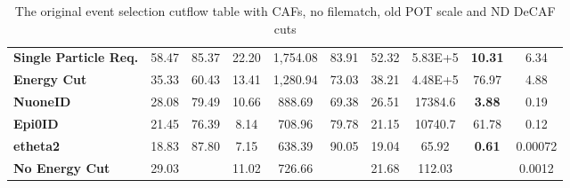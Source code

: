 \begin{table}[!hb]
\begin{tabular}{|l|ccc|ccc|ccc|}
\textbf{Single Particle Req.}                            & 58.47                                  & 85.37     & 22.20     & 1,754.08                                         & 83.91     & 52.32     & 5.83E+5                                         & \textbf{10.31}     & 6.34      \\
\textbf{Energy Cut}                                      & 35.33                                  & 60.43     & 13.41     & 1,280.94                                         & 73.03     & 38.21     & 4.48E+5                                         & 76.97     & 4.88      \\
\textbf{NuoneID}                                         & 28.08                                  & 79.49     & 10.66     & 888.69                                          & 69.38     & 26.51     & 17384.6                                         & \textbf{3.88}      & 0.19      \\
\textbf{Epi0ID}                                          & 21.45                                  & 76.39     & 8.14      & 708.96                                          & 79.78     & 21.15     & 10740.7                                         & 61.78     & 0.12      \\
\rowcolor[HTML]{67FD9A} 
\textbf{etheta2}                                         & 18.83                                  & 87.80     & 7.15      & 638.39                                          & 90.05     & 19.04     & 65.92                                           & \textbf{0.61}      & 0.00072   \\\hline\hline
\textbf{No Energy Cut}                                   & 29.03                                  &           & 11.02     & 726.66                                          &           & 21.68     & 112.03                                          &           & 0.0012   \\\hline
\end{tabular}
\caption{The original event selection cutflow table with CAFs, no filematch, old POT scale and ND DeCAF cuts}
\label{tab:CutflowTableSignal}
\end{table}

